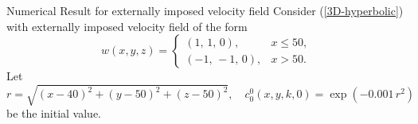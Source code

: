     

    
         \begin{frame}{Numerical Result for externally imposed velocity field}
    	\scriptsize
    	Consider (\ref{3D-hyperbolic}) with externally imposed velocity field of the form
    	\[
    	w(x,y,z) =
    	\begin{cases}
    		(1,\,1,\,0), & x \leq 50, \\[6pt]
    		(-1,\,-1,\,0), & x > 50 .
    	\end{cases}
    	\]
    	Let 
    	\[
    	r = \sqrt{(x-40)^2+(y-50)^2+(z-50)^2}, \quad
    	c^0_0(x, y, k, 0) = \exp(-0.001 \, r^2)
    	\] 
    	be the initial value. 
    	

\end{frame}
